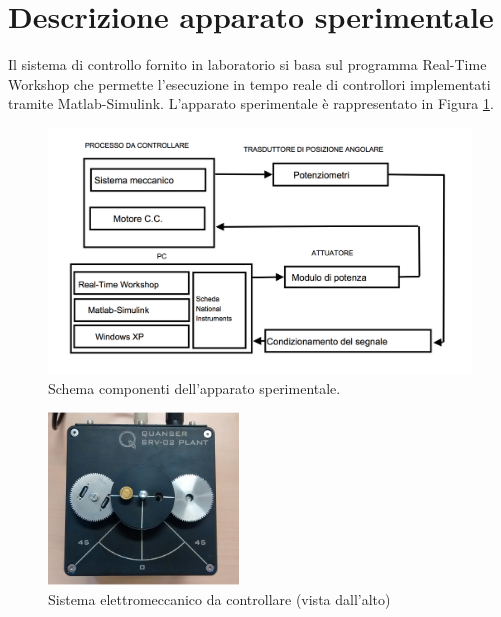 \section{Descrizione apparato sperimentale}	
\label{sec:DEscrizioneApparatoSperimentale}

	Il sistema di controllo fornito in laboratorio si basa sul programma Real-Time Workshop che permette l'esecuzione in tempo reale di controllori implementati tramite Matlab-Simulink. L'apparato sperimentale è rappresentato in Figura \ref{fig:apparatoSperimentale}.
	
	\begin{figure}[H]
		\centering
		\includegraphics[width=1\textwidth]{./figure/apparato_sperimentale}
		\caption{Schema componenti dell'apparato sperimentale.}
		\label{fig:apparatoSperimentale}
	\end{figure}
	
	\begin{figure}[H]
		\centering
		\includegraphics[width=0.45\textwidth]{./figure/motore}
		\caption{Sistema elettromeccanico da controllare (vista dall'alto)}
		\label{fig:fotoMotore}
	\end{figure}
	
